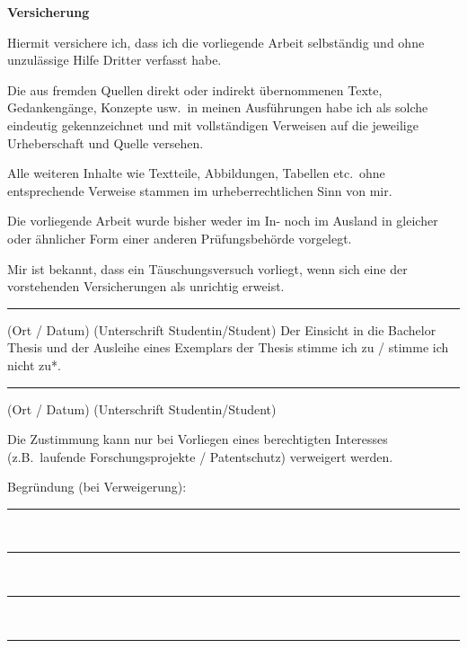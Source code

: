 \newpage
\thispagestyle{empty}
\rule[0ex]{0ex}{0ex} 	%
\newpage
\thispagestyle{empty} 
%
{\bf Versicherung}
\par
Hiermit versichere ich, dass ich die vorliegende Arbeit selbst\"andig und ohne unzul\"assige Hilfe Dritter verfasst 
habe.
\par
Die aus fremden Quellen direkt oder indirekt \"ubernommenen Texte, Gedankeng\"ange, Konzepte usw.\ in meinen 
Ausf\"uhrungen habe ich als solche eindeutig gekennzeichnet und mit vollst\"andigen Verweisen auf die jeweilige 
Urheberschaft und Quelle versehen.
\par
Alle weiteren Inhalte wie Textteile, Abbildungen, Tabellen etc.\ ohne entsprechende Verweise stammen im 
urheberrechtlichen Sinn von mir.
\par
Die vorliegende Arbeit wurde bisher weder im In- noch im Ausland in gleicher oder \"ahnlicher Form einer anderen 
Pr\"ufungsbeh\"orde vorgelegt.
\par
Mir ist bekannt, dass ein T\"auschungsversuch vorliegt, wenn sich eine der vorstehenden Versicherungen als 
unrichtig erweist.
\par
\vspace{25mm}
\rule[0ex]{\textwidth}{0.4pt}
(Ort / Datum)\hspace{30ex}	(Unterschrift Studentin/Student)
\newpage
\thispagestyle{empty} 
%
Der Einsicht in die Bachelor Thesis  und der Ausleihe eines Exemplars der Thesis stimme ich zu / stimme ich nicht zu*.
\par\vspace{10mm}
\rule[0ex]{\textwidth}{0.4pt}
(Ort / Datum)\hspace{30ex}	(Unterschrift Studentin/Student)
\par\vspace{10mm}
Die Zustimmung kann nur bei Vorliegen eines berechtigten Interesses (z.B.\ laufende Forschungsprojekte / Patentschutz) 
verweigert werden. 
\par
Begr\"undung (bei Verweigerung): \\[5ex]
\rule[0ex]{\textwidth}{0.4pt} \\[2ex]
\rule[0ex]{\textwidth}{0.4pt} \\[2ex]
\rule[0ex]{\textwidth}{0.4pt} \\[2ex]
\rule[0ex]{\textwidth}{0.4pt} \\[2ex]
